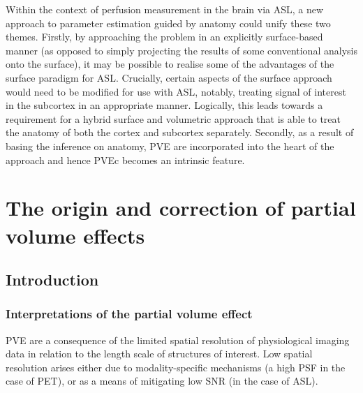 \documentclass[12pt]{report}
\begin{document}
Within the context of perfusion measurement in the brain via ASL, a new approach to parameter estimation guided by anatomy could unify these two themes. Firstly, by approaching the problem in an explicitly surface-based manner (as opposed to simply projecting the results of some conventional analysis onto the surface), it may be possible to realise some of the advantages of the surface paradigm for ASL. Crucially, certain aspects of the surface approach would need to be modified for use with ASL, notably, treating signal of interest in the subcortex in an appropriate manner. Logically, this leads towards a requirement for a hybrid surface and volumetric approach that is able to treat the anatomy of both the cortex and subcortex separately. Secondly, as a result of basing the inference on anatomy, PVE are incorporated into the heart of the approach and hence PVEc becomes an intrinsic feature. 

 \newpage 
 \newpage %


\chapter{The origin and correction of partial volume effects}
\label{pvec_chapter}

\section{Introduction}
\subsection{Interpretations of the partial volume effect}

PVE are a consequence of the limited spatial resolution of physiological imaging data in relation to the length scale of structures of interest. Low spatial resolution arises either due to modality-specific mechanisms (a high PSF in the case of PET), or as a means of mitigating low SNR (in the case of ASL). 
\end{document}
